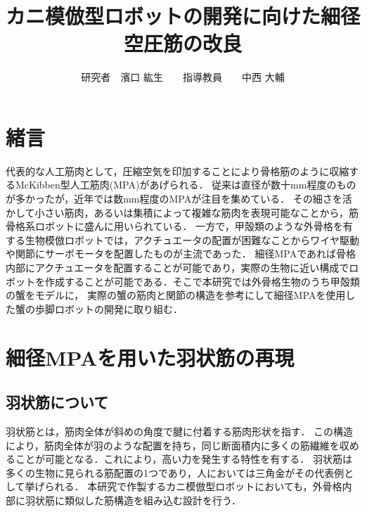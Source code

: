 \documentclass{jarticle}
\begin{document}

\title{
カニ模倣型ロボットの開発に向けた細径空圧筋の改良
}
\author{
研究者　濱口 紘生　　指導教員　　中西 大輔
}

\maketitle

\thispagestyle{empty}  %

\section{緒言}

代表的な人工筋肉として，圧縮空気を印加することにより骨格筋のように収縮するMcKibben型人工筋肉(MPA)があげられる．
従来は直径が数十mm程度のものが多かったが，近年では数mm程度のMPAが注目を集めている\cite{wakimoto}．
その細さを活かして小さい筋肉，あるいは集積によって複雑な筋肉を表現可能なことから，筋骨格系ロボットに盛んに用いられている\cite{wakimoto}．
一方で，甲殻類のような外骨格を有する生物模倣ロボットでは，アクチュエータの配置が困難なことからワイヤ駆動や関節にサーボモータを配置したものが主流であった\cite{crabrobot1}．
細径MPAであれば骨格内部にアクチュエータを配置することが可能であり，実際の生物に近い構成でロボットを作成することが可能である．そこで本研究では外骨格生物のうち甲殻類の蟹をモデルに，
実際の蟹の筋肉と関節の構造を参考にして細径MPAを使用した蟹の歩脚ロボットの開発に取り組む．

\vspace*{-2mm}
\section{細径MPAを用いた羽状筋の再現}
\vspace*{-1mm}
\subsection{羽状筋について}
羽状筋とは，筋肉全体が斜めの角度で腱に付着する筋肉形状を指す．
この構造により，筋肉全体が羽のような配置を持ち，同じ断面積内に多くの筋繊維を収めることが可能となる．これにより，高い力を発生する特性を有する．
羽状筋は多くの生物に見られる筋配置の1つであり，人においては三角金がその代表例として挙げられる．
本研究で作製するカニ模倣型ロボットにおいても，外骨格内部に羽状筋に類似した筋構造を組み込む設計を行う．
\vspace*{-1mm}
\end{document}

